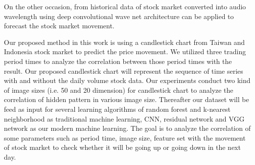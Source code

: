 \documentclass[10pt,twocolumn]{article}
\begin{document}
\par
On the other occasion, from historical data of stock market converted into audio wavelength using deep convolutional wave net architecture can be applied to forecast the stock market movement\cite{borovykhdilated}.
\par 
Our proposed method in this work is using a candlestick chart from Taiwan and Indonesia stock market to predict the price movement. We utilized  three trading period times to analyze the correlation between those period times with the result. Our proposed candlestick chart will represent the sequence of time series with and without the daily volume stock data. Our experiments conduct two kind of image sizes (i.e. 50 and 20 dimension) for candlestick chart to analyze the correlation of hidden pattern in various image size. Thereafter our dataset will be feed as input for several learning algorithms of random forest and k-nearest neighborhood as traditional machine learning, CNN, residual network and VGG network as our modern machine learning. The goal is to analyze the correlation of some parameters such as period time, image size, feature set with the movement of stock market to check whether it will be going up or going down in the next day.
\end{document}

